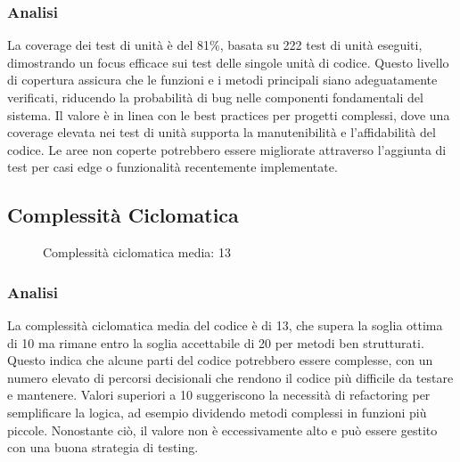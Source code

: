 \documentclass[a4paper,11pt,oneside]{scrartcl}
\begin{document}
\subsubsection*{Analisi}

La coverage dei test di unità è del 81\%, basata su 222 test di unità eseguiti, dimostrando un focus efficace sui test delle singole unità di codice. Questo livello di copertura assicura che le funzioni e i metodi principali siano adeguatamente verificati, riducendo la probabilità di bug nelle componenti fondamentali del sistema. Il valore è in linea con le best practices per progetti complessi, dove una coverage elevata nei test di unità supporta la manutenibilità e l'affidabilità del codice. Le aree non coperte potrebbero essere migliorate attraverso l'aggiunta di test per casi edge o funzionalità recentemente implementate.

\subsection{Complessità Ciclomatica}

\begin{figure}[H]
    \centering
    \caption{Complessità ciclomatica media: 13}
    \label{fig:complessita_ciclomatica}
\end{figure}

\subsubsection*{Analisi}

La complessità ciclomatica media del codice è di 13, che supera la soglia ottima di 10 ma rimane entro la soglia accettabile di 20 per metodi ben strutturati. Questo indica che alcune parti del codice potrebbero essere complesse, con un numero elevato di percorsi decisionali che rendono il codice più difficile da testare e mantenere. Valori superiori a 10 suggeriscono la necessità di refactoring per semplificare la logica, ad esempio dividendo metodi complessi in funzioni più piccole. Nonostante ciò, il valore non è eccessivamente alto e può essere gestito con una buona strategia di testing.
\end{document}
